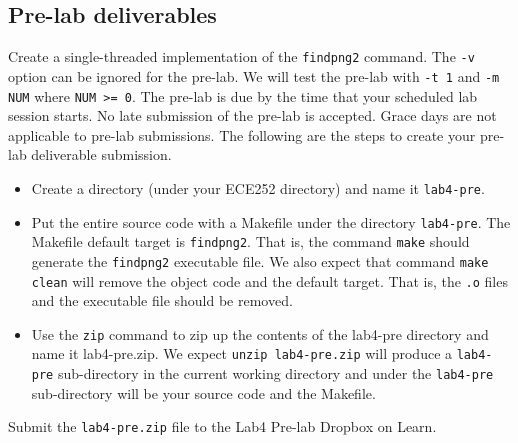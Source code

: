 \subsection{Pre-lab deliverables}
\label{sec:lab4-pre-lab-deliverable}
Create a single-threaded implementation of the \verb+findpng2+ command. The \verb+-v+ option can be ignored for the pre-lab. We will test the pre-lab with \verb+-t 1+ and \verb+-m NUM+ where \verb+NUM >= 0+. The pre-lab is due by the time that your scheduled lab session starts. No late submission of the pre-lab is accepted. Grace days are not applicable to pre-lab submissions. The following are the steps to create your pre-lab deliverable submission.
\begin{itemize}
\item Create a directory (under your ECE252 directory) and name it \verb+lab4-pre+.
\item Put the entire source code with a Makefile under the directory \verb+lab4-pre+. The Makefile default target is \verb+findpng2+. That is, the command \verb+make+ should generate the \verb+findpng2+ executable file. We also expect that command \verb+make clean+ will remove the object code and the default target. That is, the \verb+.o+ files and the executable file should be removed.
\item Use the \verb+zip+ command to zip up the contents of the lab4-pre directory and name it lab4-pre.zip. We expect \verb+unzip lab4-pre.zip+ will produce a \verb+lab4-pre+ sub-directory in the current working directory and under the \verb+lab4-pre+ sub-directory will be your source code and the Makefile.
\end{itemize}
Submit the \verb+lab4-pre.zip+ file to the Lab4 Pre-lab Dropbox on Learn.

